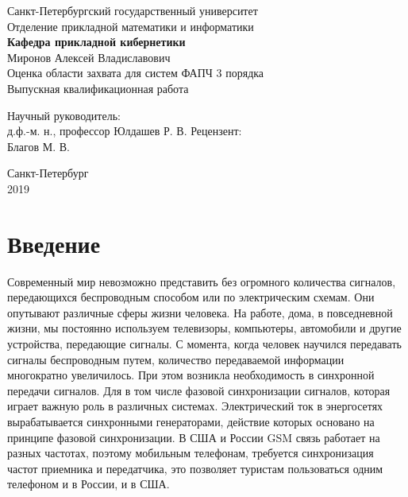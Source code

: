\documentclass[a4paper,14pt]{extarticle} %
\begin{document}


 
\begin{center}
\hfill \break
\normalsize{Санкт-Петербургский государственный университет}\\ 
\hfill \break
\normalsize{Отделение прикладной математики и информатики}\\
\normalsize{\textbf{Кафедра прикладной кибернетики}}\\
\hfill \break
\hfill \break 
\hfill \break
\hfill \break
\hfill\break
\hfill \break
\normalsize{Миронов Алексей Владиславович}\\
\hfill \break
\large{Оценка области захвата для систем ФАПЧ 3 порядка}\\
\hfill \break
\small{Выпускная квалификационная работа}\\
\hfill \break
\hfill \break
\hfill \break
\hfill \break
\hfill \break
\hfill \break
\end{center}
 
\hfill \break
\hfill \break
\hfill \break
 
 \small{
\begin{flushright}
Научный руководитель:\\
д.ф.-м. н., профессор Юлдашев Р. В.
\break \break
\break \break
Рецензент:\\
Благов М. В.
\end{flushright}
}
\hfill \break
\hfill \break
\hfill \break
\hfill \break
\hfill \break
\hfill \break
\hfill \break
\hfill \break
\hfill \break
\hfill \break
\hfill \break
\begin{center} Санкт-Петербург \\
2019 \end{center}
\thispagestyle{empty} %

 \tableofcontents
\newpage
\section{Введение}
Современный мир невозможно представить без огромного количества сигналов, передающихся беспроводным способом или по электрическим схемам. Они опутывают различные сферы жизни человека. На работе, дома, в повседневной жизни, мы постоянно используем телевизоры, компьютеры, автомобили и другие устройства, передающие сигналы. С момента, когда человек научился передавать сигналы беспроводным путем, количество передаваемой информации многократно увеличилось. При этом возникла необходимость в синхронной передачи сигналов. Для  в том числе фазовой синхронизации сигналов, которая играет важную роль в различных системах. Электрический ток в энергосетях вырабатывается синхронными генераторами, действие которых основано на принципе фазовой синхронизации. В США и России GSM связь работает на разных частотах, поэтому мобильным телефонам, требуется синхронизация частот приемника и передатчика, это позволяет туристам пользоваться одним телефоном и в России, и в США.
\end{document}
